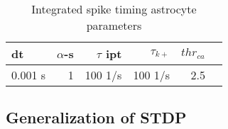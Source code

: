 \documentclass[conference]{IEEEtran}
\newcommand{\ca}{\gls{ca}\textrm{ }}
\newcommand{\ipt}{\gls{ipt}\textrm{ }}
\begin{document}


\begin{table}[!htp] \centering
  \caption{Integrated spike timing astrocyte parameters} \label{table:istp_params}
  \scriptsize
  \begin{tabular}{lrrrrr}\toprule
    dt &$\alpha$-s &$\tau$ \ipt & $\tau_{k+}$ & $thr_{ca}$ \\\midrule
    0.001 s &1 &100 1/s &100 1/s &2.5 \\
    \bottomrule
  \end{tabular}
\end{table}

\subsection{Generalization of STDP}



\end{document}
